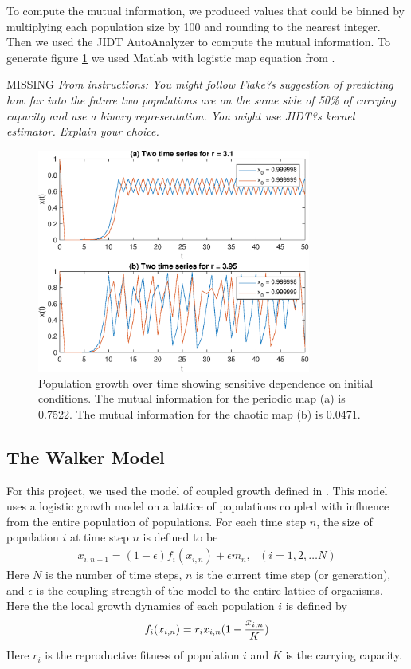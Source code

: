 \documentclass[conference]{IEEEtran}
\begin{document}
To compute the mutual information, we produced values that could be binned by multiplying each population size by 100 and rounding to the nearest integer.  Then we used the JIDT AutoAnalyzer \cite{JIDT} to compute the mutual information.    To generate figure \ref{figure1abcd} we used Matlab \cite{Matlab} with logistic map equation from \cite{Mitchell}.  

MISSING {\it From instructions:  You might follow Flake?s suggestion of predicting how far into the future two populations are on the same side of 50\% of carrying capacity and use a binary representation. You might use JIDT?s kernel estimator. Explain your choice. }



\begin{figure}[H]
\centering
 \includegraphics[width=90mm]{figure1abcd_combined}
    
  \caption{ Population growth over time showing sensitive dependence on initial conditions.  The mutual information for the periodic map (a) is 0.7522.  The mutual information for the chaotic map (b) is 0.0471.}
 \label{figure1abcd}
\end{figure} 

\subsection{The Walker Model}
For this project, we used the  model of coupled growth defined in \cite{Walker}. This model uses a logistic growth model on a lattice of populations coupled with influence from the entire population of populations.  For each time step $n$, the size of population $i$ at time step $n$ is defined to be
\begin{eqnarray}
x_{i, n+1} = (1 - \epsilon) f_i(x_{i,n}) + \epsilon m_n, \ \ \ (i=1, 2, \ldots N)
\label{coupling}
\end{eqnarray}
Here $N$ is the number of time steps, $n$ is the current time step (or generation), and $\epsilon$ is the coupling strength of the model to the entire lattice of organisms.   Here the the local growth dynamics of each population $i$ is defined by 
\begin{eqnarray}
f_i(x_{i,n}) = r_i x_{i,n} (1 - {x_{i,n} \over K})
\label{individual}
\end{eqnarray}
Here $r_i$ is the reproductive fitness of population $i$ and $K$ is the carrying capacity.    
\end{document}
